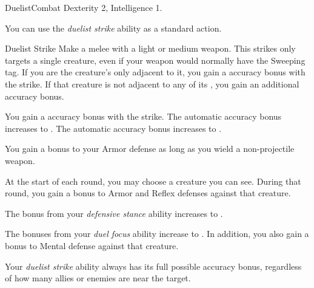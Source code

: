     \begin{feat}{Duelist}{Combat}
        \featpre Dexterity 2, Intelligence 1.

         You can use the \textit{duelist strike} ability as a standard action.
        \begin{activeability}{Duelist Strike}
            \rankline
            Make a melee  with a light or medium weapon.
            This strikes only targets a single creature, even if your weapon would normally have the Sweeping tag.
            If you are the creature's only  adjacent to it, you gain a  accuracy bonus with the strike.
            If that creature is not adjacent to any of its , you gain an additional  accuracy bonus.

            \rankline
             You gain a  accuracy bonus with the strike.
             The automatic accuracy bonus increases to .
             The automatic accuracy bonus increases to .
        \end{activeability}

         You gain a  bonus to your Armor defense as long as you wield a non-projectile weapon.

         At the start of each round, you may choose a creature you can see.
        During that round, you gain a  bonus to Armor and Reflex defenses against that creature.

         The bonus from your \textit{defensive stance} ability increases to .

         The bonuses from your \textit{duel focus} ability increase to .
        In addition, you also gain a  bonus to Mental defense against that creature.

         Your \textit{duelist strike} ability always has its full possible accuracy bonus, regardless of how many allies or enemies are near the target.
    \end{feat}

